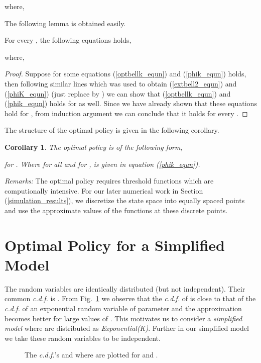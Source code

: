 \documentclass[onecolumn]{IEEEtran}
\newtheorem{corollary}[theorem]{Corollary}
\begin{document}
where,

The following lemma is obtained easily.
\begin{lemma}
For every , the following equations holds,

where,

\end{lemma}
\begin{proof}
Suppose for some  equations (\ref{optbellk_equn}) and
  (\ref{phik_equn}) holds, then following similar lines which was used
  to obtain  (\ref{extbell2_equn}) and (\ref{phiK_equn})
  (just replace  by ) we can show that 
  (\ref{optbellk_equn}) and (\ref{phik_equn}) holds for  as well.
  Since we have already shown that these equations hold for ,
  from induction argument we can conclude that it holds for every
  .
\end{proof}
\noindent
The structure of the optimal policy is given in the following corollary.

\begin{corollary}
  The optimal policy  is of the following form,

for . Where  for all  and for ,  is given in equation (\ref{phik_equn}).
\hfill 
\end{corollary}

\noindent
\emph{Remarks:} The optimal policy requires threshold functions  which are
computionally intensive. For our later numerical work in Section
(\ref{simulation_results}), we discretize the state space into
 equally spaced points and use the approximate values of the
functions  at these discrete points.

\section{Optimal Policy for a Simplified Model}
\label{suboptimal_policy}
The random variables  are identically distributed
\cite[Chapter 2]{orderstatistics} (but not independent). Their common
\emph{c.d.f.} is .  From Fig.~\ref{cdf_figu} we
observe that the \emph{c.d.f.} of  is close to that of
the \emph{c.d.f.} of an exponential random variable of parameter  and the
approximation becomes better for large values of . This motivates
us to consider a \emph{simplified model} where 
are distributed as \emph{Exponential(K)}. Further in our simplified
model we take these random variables to be independent.
\begin{figure}[ht]
\centering
{}
\caption{The \emph{c.d.f.}'s   and  where  are plotted for   and  .\label{cdf_figu}}
\end{figure}
\end{document}
